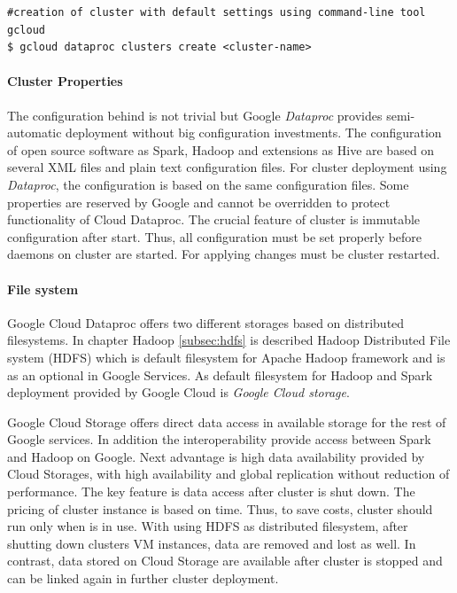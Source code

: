\documentclass[a4paper,12pt,oneside]{report}
\begin{document}
	
	
	\begin{footnotesize}
		\begin{lstlisting}[style=mybash]
#creation of cluster with default settings using command-line tool gcloud
$ gcloud dataproc clusters create <cluster-name>
		\end{lstlisting}
	\end{footnotesize}
	
	
	\paragraph{Cluster Properties} The configuration behind is not trivial but Google
	\textit{Dataproc} provides	semi-automatic deployment without big configuration investments.
	The configuration of open source software as Spark, Hadoop  and extensions as Hive	are based 
	on several XML files and plain text configuration files. For cluster deployment 
	using \textit{Dataproc}, the configuration is based on the same configuration	files. Some 
	properties are reserved by Google and cannot be overridden 
	to protect functionality of Cloud Dataproc. The crucial feature of cluster is
	immutable 	configuration after start. Thus, all configuration must be set 
	properly before daemons on cluster are started. For applying changes must be cluster
	restarted. 
	
	\paragraph{File system}
	Google Cloud Dataproc offers two different storages based on distributed
	filesystems. In chapter Hadoop \ref{subsec:hdfs} is described Hadoop Distributed File
	system (HDFS) which is default filesystem for Apache Hadoop framework and is as an optional in Google
	Services. As default filesystem for Hadoop and Spark deployment provided by Google Cloud is
	 \textit{Google Cloud storage}. 
	
	Google Cloud Storage offers direct data access in available storage for the
	rest of Google 	services. In addition the interoperability provide access between Spark and
	Hadoop on Google. 	Next advantage is high data availability provided by Cloud
	Storages, with high availability and global replication without reduction of
	performance. The key feature is data access after cluster is shut down. 
	The pricing of cluster instance is based on time. Thus, to save costs, cluster
	should run only when is in use. With using HDFS as distributed filesystem, after 
	shutting down clusters VM instances, data are removed and lost as well. In contrast,
	data stored on 	Cloud Storage are available after cluster is stopped and 
	can be linked again in further cluster deployment.
	
\end{document}
